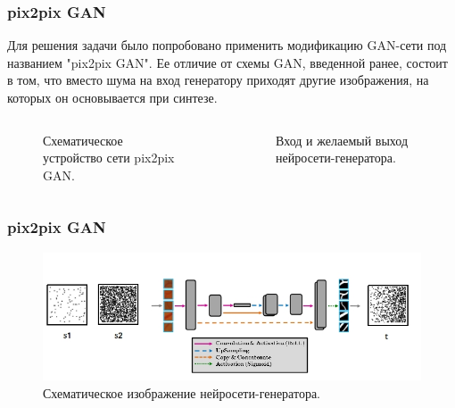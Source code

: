 \documentclass[12pt]{beamer}
\begin{document}
\begin{frame}\frametitle{pix2pix GAN}
	Для решения задачи было попробовано применить модификацию GAN-сети под названием "pix2pix GAN". Ее отличие от схемы GAN, введенной ранее, состоит в том, что вместо шума на вход генератору приходят другие изображения, на которых он основывается при синтезе.
	\begin{columns}
			\begin{figure}
				\caption{Схематическое устройство сети pix2pix GAN.}
				\label{p2p}
			\end{figure}
			\begin{figure}
				\caption{Вход и желаемый выход нейросети-генератора.}
				\label{p2p-gen}
			\end{figure}
	\end{columns}
\end{frame}

\begin{frame}\frametitle{pix2pix GAN}
	\begin{figure}
		\includegraphics[width=1.0\linewidth]{unet-scheme}
		\caption{Схематическое изображение нейросети-генератора.}
	\end{figure}
\end{frame}
\end{document}
